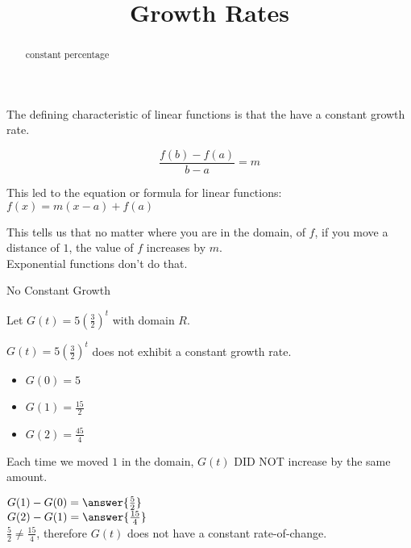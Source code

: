 \documentclass{ximera}
\title{Growth Rates}
\begin{document}
\begin{abstract}
constant percentage
\end{abstract}
\maketitle











The defining characteristic of linear functions is that the have a constant growth rate.


\[   \frac{f(b)-f(a)}{b-a} = m       \]

This led to the equation or formula for linear functions:  $f(x) = m(x-a) + f(a)$


This tells us that no matter where you are in the domain, of $f$, if you move a distance of $1$, the value of $f$ increases by $m$. \\


Exponential functions don't do that. \\






\begin{fact}  No Constant Growth

Let $G(t) = 5 \left(\frac{3}{2}\right)^t$ with domain \textbf{$R$}. 

$G(t) = 5 \left(\frac{3}{2}\right)^t$  does not exhibit a constant growth rate. 




\begin{itemize}
\item $G(0) = 5$
\item $G(1) = \frac{15}{2}$
\item $G(2) = \frac{45}{4}$
\end{itemize}



Each time we moved $1$ in the domain, $G(t)$ DID NOT increase by the same amount.

$G(1) - G(0) = \answer{\frac{5}{2}}$ \\

$G(2) - G(1) = \answer{\frac{15}{4}}$ \\

$ \frac{5}{2}  \ne  \frac{15}{4} $, therefore $G(t)$ does not have a constant rate-of-change. \\

\end{fact}
\end{document}
